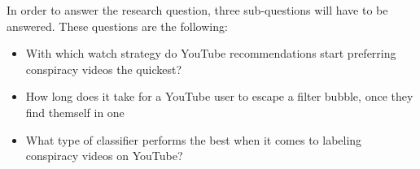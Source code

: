 \documentclass[../main.tex]{subfiles}
\begin{document}
\vspace{0.1in}
\noindent In order to answer the research question, three sub-questions will have to be answered. These questions are the following:
\begin{itemize}
    \item With which watch strategy do YouTube recommendations start preferring conspiracy videos the quickest?
    \item How long does it take for a YouTube user to escape a filter bubble, once they find themself in one
    \item What type of classifier performs the best when it comes to labeling conspiracy videos on YouTube?
\end{itemize}
\end{document}
